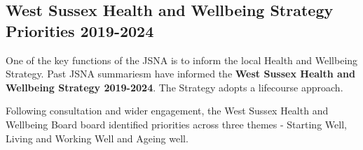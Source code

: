 


\subsection{West Sussex Health and Wellbeing Strategy Priorities 2019-2024}
One of the key functions of the JSNA is to inform the local Health and Wellbeing Strategy. Past JSNA summariesm have informed the {\bf West Sussex Health and Wellbeing Strategy 2019-2024}. The Strategy adopts a lifecourse approach. 

Following consultation and wider engagement, the West Sussex Health and Wellbeing Board board identified priorities across three themes - Starting Well, Living and Working Well and Ageing well.


